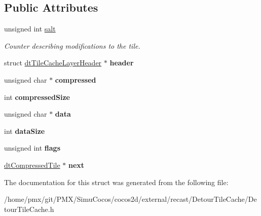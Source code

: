 \subsection*{Public Attributes}
\begin{DoxyCompactItemize}
\item 
\mbox{\label{structdtCompressedTile_a9df1de3328c707f4fb75d15522ec8ec3}} 
unsigned int \hyperlink{structdtCompressedTile_a9df1de3328c707f4fb75d15522ec8ec3}{salt}
\begin{DoxyCompactList}\small\item\em Counter describing modifications to the tile. \end{DoxyCompactList}\item 
\mbox{\label{structdtCompressedTile_a552fff4c0f77e482a40aa6870137b63d}} 
struct \hyperlink{structdtTileCacheLayerHeader}{dt\+Tile\+Cache\+Layer\+Header} $\ast$ {\bfseries header}
\item 
\mbox{\label{structdtCompressedTile_a59659ea10c7f8ea66e999bb0746c4b97}} 
unsigned char $\ast$ {\bfseries compressed}
\item 
\mbox{\label{structdtCompressedTile_a27134afd3e266ece7c7465bf04f04b8d}} 
int {\bfseries compressed\+Size}
\item 
\mbox{\label{structdtCompressedTile_a7010d1340dad07e03254379843b01809}} 
unsigned char $\ast$ {\bfseries data}
\item 
\mbox{\label{structdtCompressedTile_a6bd5d2ea63921ee6fbacece1da31d656}} 
int {\bfseries data\+Size}
\item 
\mbox{\label{structdtCompressedTile_a0c847cc83252015006215c720fb9936b}} 
unsigned int {\bfseries flags}
\item 
\mbox{\label{structdtCompressedTile_a795880ef1d24a1d8721491c5aab6d34a}} 
\hyperlink{structdtCompressedTile}{dt\+Compressed\+Tile} $\ast$ {\bfseries next}
\end{DoxyCompactItemize}


The documentation for this struct was generated from the following file\+:\begin{DoxyCompactItemize}
\item 
/home/pmx/git/\+P\+M\+X/\+Simu\+Cocos/cocos2d/external/recast/\+Detour\+Tile\+Cache/Detour\+Tile\+Cache.\+h\end{DoxyCompactItemize}
